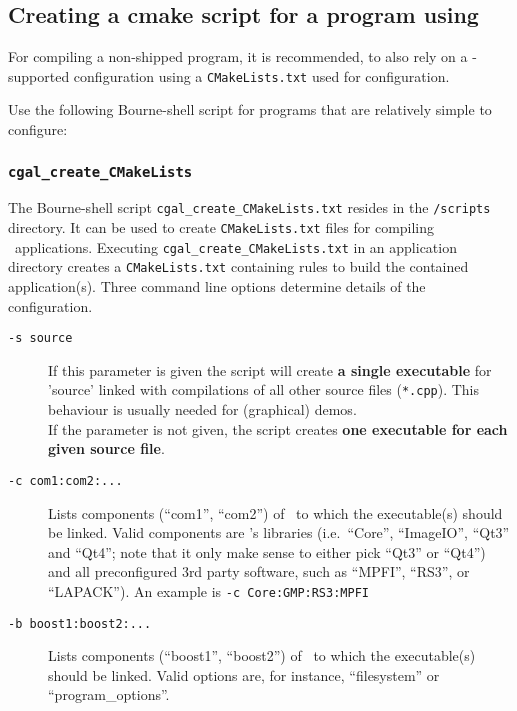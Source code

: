 \subsection{Creating a cmake script for a program using \cgal}

For compiling a non-shipped program, it is
recommended, to also rely on a \cmake-supported configuration using a
\texttt{CMakeLists.txt} used for configuration. 

Use the following Bourne-shell script for programs that are relatively
simple to configure:

\subsubsection{\texttt{cgal\_create\_CMakeLists\label{sec:create_cgal_CMakeLists}}}

The Bourne-shell script \texttt{cgal\_create\_CMakeLists.txt} resides in the
\texttt{\cgalrel/scripts} directory. It can be used to create
\texttt{CMakeLists.txt} files for compiling \cgal\ applications. Executing
\texttt{cgal\_create\_CMakeLists.txt} in an application directory creates a
\texttt{CMakeLists.txt} containing rules to build the contained
application(s). Three command line options determine details of the
configuration.

\begin{description}
\item [\texttt{-s source}] If this parameter is given the script will
  create \textbf{a single executable} for 'source' linked with
  compilations of all other source files (\texttt{*.cpp}). This
  behaviour is usually needed for (graphical) demos. \\
  If the parameter is not given, the script creates \textbf{one executable for each given
  source file}.
\item [\texttt{-c com1:com2:...}] Lists components (``com1'',
  ``com2'') of \cgal\ to which the executable(s) should be linked. Valid components are \cgal's
  libraries (i.e.~``Core'', ``ImageIO'', ``Qt3'' and ``Qt4''; note
  that it only make sense to either pick ``Qt3'' or ``Qt4'') and all
  preconfigured 3rd party software, such as ``MPFI'', ``RS3'',
  or ``LAPACK''). An example is \texttt{-c Core:GMP:RS3:MPFI}

\item [\texttt{-b boost1:boost2:...}] Lists components (``boost1'',
  ``boost2'') of \boost\ to which the executable(s) should be
  linked. Valid options are, for instance, ``filesystem'' or ``program\_options''.

\end{description}

